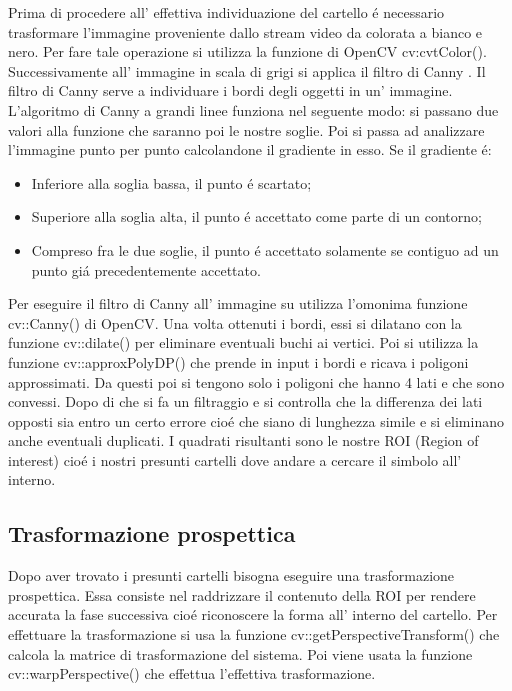	Prima di procedere all' effettiva individuazione del cartello \'e necessario trasformare l'immagine proveniente dallo stream video da colorata a bianco e nero. Per fare tale operazione si utilizza la funzione di OpenCV cv:cvtColor(). Successivamente all' immagine  in scala di grigi si applica il filtro di Canny \cite{canny}. Il filtro di Canny serve a individuare i bordi degli oggetti in un' immagine. L'algoritmo di Canny a grandi linee funziona nel seguente modo: si passano due valori alla funzione che saranno poi le nostre soglie. Poi si passa ad analizzare l'immagine punto per punto calcolandone il gradiente in esso.  Se il gradiente \'e:
	\begin{itemize}
		\item Inferiore alla soglia bassa, il punto \'e scartato;
		\item Superiore alla soglia alta, il punto \'e accettato come parte di un contorno;
		\item Compreso fra le due soglie, il punto \'e accettato solamente se contiguo ad un punto gi\'a precedentemente accettato.
	\end{itemize}
	Per eseguire il filtro di Canny all' immagine su utilizza l'omonima funzione cv::Canny() di OpenCV.
	Una volta ottenuti i bordi, essi si dilatano con la funzione cv::dilate() per eliminare eventuali buchi ai vertici.
	Poi si utilizza la funzione cv::approxPolyDP() che prende in input i bordi e ricava i poligoni approssimati.
	Da questi poi si tengono solo i poligoni che hanno 4 lati e che sono convessi.
	Dopo di che si fa un filtraggio e si controlla che la differenza dei lati opposti sia entro un certo errore cio\'e che siano di lunghezza simile e si eliminano anche eventuali duplicati.
	I quadrati risultanti sono le nostre ROI (Region of interest) cio\'e i nostri presunti cartelli dove andare a cercare il simbolo all' interno.

\subsection{Trasformazione prospettica}

	Dopo aver trovato i presunti cartelli bisogna eseguire una trasformazione prospettica. Essa consiste nel raddrizzare il contenuto della ROI per rendere accurata la fase successiva cio\'e riconoscere la forma all' interno del cartello.
	Per effettuare la trasformazione si usa la funzione cv::getPerspectiveTransform() che calcola la matrice di trasformazione del sistema. Poi viene usata la funzione cv::warpPerspective() che effettua l'effettiva trasformazione.

